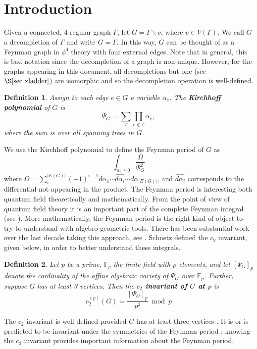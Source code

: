 \documentclass[12pt]{amsart}
\newtheorem{definition}{Definition}
\numberwithin{definition}{section}
\begin{document}
\section{Introduction}
Given a connected, 4-regular graph $\Gamma$, let $G=\Gamma\backslash v$, where $v\in V(\Gamma)$. We call $G$ a decompletion of $\Gamma$ and write $G=\widetilde{\Gamma}$. In this way, $G$ can be thought of as a Feynman graph in $\phi^4$ theory with four external edges. Note that in general, this is bad notation since the decompletion of a graph is non-unique. However, for the graphs appearing in this document, all decompletions but one (see $\S \ref{sec xladder}$) are isomorphic and so the decompletion operation is well-defined. \\
\begin{definition}Assign to each edge $e\in G$ a variable $\alpha_e$. The \textbf{Kirchhoff polynomial} of $G$ is 
	\[\Psi_G=\sum_{T}\prod_{e\not\in T}\alpha_e,\]
	where the sum is over all spanning trees in $G$.
\end{definition}
We use the Kirchhoff polynomial to define the Feynman period of $G$ as 
\[\int_{\alpha_i\geq0}\frac{\Omega}{\Psi_G^2}\]
where $\Omega=\sum_i^{|E(G)|}(-1)^{i-1}d\alpha_1\cdots \widehat{d\alpha_i}\cdots d\alpha_{|E(G)|}$, and $\widehat{d\alpha_i}$ corresponds to the differential not appearing in the product. The Feynman period is interesting both quantum field theoretically and mathematically.  From the point of view of quantum field theory it is an important part of the complete Feynman integral (see \cite{Schnetz2010}).  More mathematically, the Feynman period is the right kind of object to try to understand with algebro-geometric tools.  There has been substantial work over the last decade taking this approach, see \cite{BlochEsnaultKreimer2006, BroadhurstSchnetz2014, Brown2009, Marcolli2010}. Schnetz \cite{Schnetz2011} defined the $c_2$ invariant, given below, in order to better understand these integrals.\\
\begin{definition}Let $p$ be a prime, $\mathds{F}_p$ the finite field with $p$ elements, and let $[\Psi_G]_p$ denote the cardinality of the affine algebraic variety of $\Psi_G$ over $\mathds{F}_p$. Further, suppose $G$ has at least 3 vertices. Then the \textbf{$c_2$ invariant of $G$ at $p$} is
	\[c_2^{(p)}(G)=\frac{[\Psi_G]_p}{p^2}\bmod p\]
\end{definition}
The $c_2$ invariant is well-defined provided $G$ has at least three vertices \cite{Schnetz2011}. It is or is predicted to be invariant under the symmetries of the Feynman period \cite{BrownSchnetz2012, Doryn2013}; knowing the $c_2$ invariant provides important information about the Feynman period. \\ \\
\end{document}
